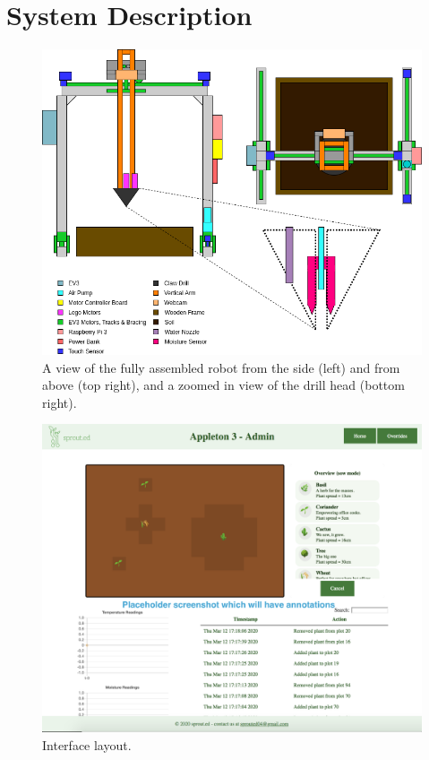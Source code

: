 \documentclass{article}
\begin{document}
\section{System Description}\label{sec:description}

\begin{figure}[h]
    \centering
    \includegraphics[width=1\linewidth]{figs-userguide/diagram.png}
    \caption{A view of the fully assembled robot from the side (left) and from above (top right), and a zoomed in view of the drill head (bottom right).}
    \label{fig:the-robot}
\end{figure}

\begin{figure}[h]
    \centering
    \includegraphics[width=1\linewidth]{figs-userguide/interfacePlaceholder.png}
    \caption{Interface layout.}
    \label{fig:the-interface}
\end{figure}
\end{document}
